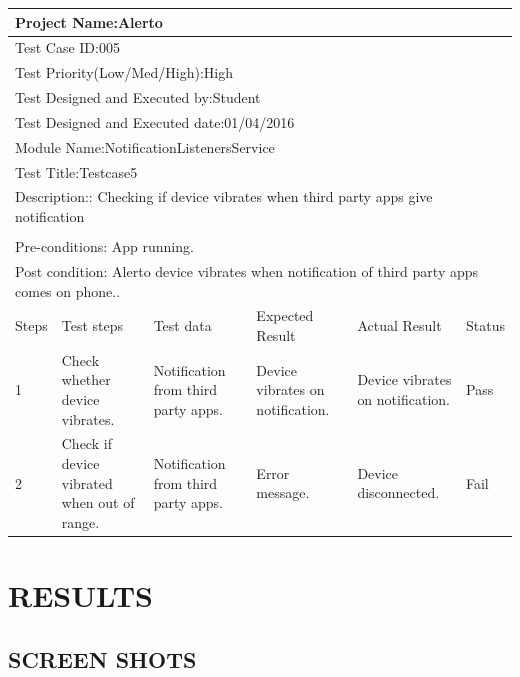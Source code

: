 \documentclass[12pt,a4paper]{report}
\begin{document}
\begin{table}[!h]
	
	\begin{tabular}{|p{0.8cm}|p{2.5cm}|p{3cm}|p{3cm}|p{3cm}|p{2.2cm}|}
		\hline
		\multicolumn{6}{|l|}{Project Name:Alerto}\\
		\hline
		\multicolumn{6}{|l|}{Test Case ID:005}\\
		\hline
		\multicolumn{6}{|l|}{Test Priority(Low/Med/High):High} \\ 
		\hline
		\multicolumn{6}{|l|}{Test Designed and Executed by:Student}\\
		\hline
		\multicolumn{6}{|l|}{Test Designed and Executed date:01/04/2016}\\
		\hline
		\multicolumn{6}{|l|}{Module Name:NotificationListenersService} \\ 
		\hline
		\multicolumn{6}{|l|}{Test Title:Testcase5} \\
		\hline
		\multicolumn{6}{|l|}{Description:: Checking if device vibrates when third party apps give notification} \\
		\hline
		\\
		\hline
		\multicolumn{6}{|l|}{Pre-conditions: App running.}\\
		\hline
		\multicolumn{6}{|l|}{Post condition: Alerto device vibrates when notification of third party apps comes on phone..}\\
		\hline
		Steps & Test steps & Test data & Expected Result & Actual Result & Status \\ 
		\hline
		1&	Check whether device vibrates.&	Notification from third party apps.&	Device vibrates on notification.&	Device vibrates on notification.&	Pass\\
		\hline
		2&	Check if device vibrated when out of range.&	Notification from third party apps.&	Error message.&	Device disconnected.&	Fail\\
		
		\hline
	\end{tabular}
\end{table}

\chapter{RESULTS}
\newpage

\section{SCREEN SHOTS}
	\begin{figure}[!h]
		\begin{center}
		\end{center}
	\end{figure}
	
\end{document}
